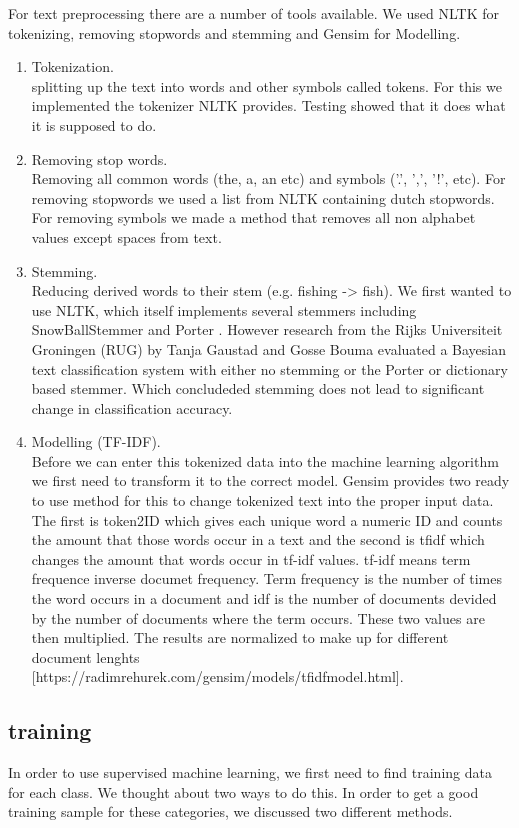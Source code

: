 For text preprocessing there are a number of tools available. We used NLTK \cite{nlkt_stemming} for tokenizing, removing stopwords and stemming and Gensim \cite{Gensim} for Modelling.
\begin{enumerate}
\item Tokenization. \\ splitting up the text into words and other symbols called tokens. For this we implemented the tokenizer NLTK provides. Testing showed that it does what it is supposed to do.
\item Removing stop words. \\ Removing all common words (the, a, an etc) and symbols ('.', ',', '!', etc). For removing stopwords we used a list from NLTK containing dutch stopwords. For removing symbols we made a method that removes all non alphabet values except spaces from text. 
\item Stemming. \\ Reducing derived words to their stem (e.g. fishing -> fish). We first wanted to use NLTK, which itself implements several stemmers including SnowBallStemmer \cite{snowball_dutch} and Porter \cite{porter_Stemmer}. However research from the Rijks Universiteit Groningen (RUG) by Tanja Gaustad and Gosse Bouma \cite{gaustad2002accurate} evaluated a Bayesian text classification system with either no stemming or the Porter or dictionary based stemmer. Which concludeded stemming does not lead to significant change in classification accuracy.
\item Modelling (TF-IDF). \\ Before we can enter this tokenized data into the machine learning algorithm we first need to transform it to the correct model. Gensim provides two ready to use method for this to change tokenized text into the proper input data. The first is token2ID which gives each unique word a numeric ID and counts the amount that those words occur in a text and the second is tfidf which changes the amount that words occur in tf-idf values. tf-idf means term frequence inverse documet frequency. Term frequency is the number of times the word occurs in a document and idf is the number of documents devided by the number of documents where the term occurs. These two values are then multiplied. The results are normalized to make up for different document lenghts [https://radimrehurek.com/gensim/models/tfidfmodel.html].
\end{enumerate}

\subsection{training}
In order to use supervised machine learning, we first need to find training data for each class. We thought about two ways to do this. In order to get a good training sample for these categories, we discussed two different methods. \\

